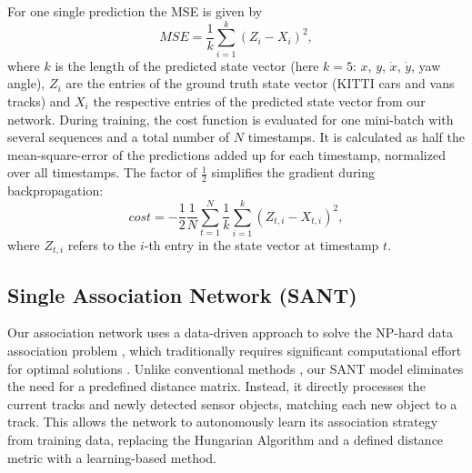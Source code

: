 \documentclass[letterpaper, 10 pt, journal, twoside]{IEEEtran}
\begin{document}
For one single prediction the \ac{MSE} is given by
\begin{equation}
	MSE = \frac{1}{k}\sum_{i=1}^{k}{({Z}_i-{{X}}_i)}^2,
\end{equation}
where $k$ is the length of the predicted state vector (here $k=5$: $x$, $y$, $\dot{x}$, $\dot{y}$, yaw angle), $Z_i$ are the entries of the ground truth state vector (KITTI cars and vans tracks) and ${X}_i$ the respective entries of the predicted state vector from our network.
During training, the cost function is evaluated for one mini-batch with several sequences and a total number of $N$ timestamps.
It is calculated as half the mean-square-error of the predictions added up for each timestamp, normalized over all timestamps.
The factor of $\frac{1}{2}$ simplifies the gradient during backpropagation:
\begin{equation}
	cost = -\frac{1}{2}\frac{1}{N} \sum_{t=1}^{N}\frac{1}{k}\sum_{i=1}^{k}{({Z_{t,i}}-{{X}_{t,i}})}^2,
\end{equation}
where $Z_{t,i}$ refers to the $i$-th entry in the state vector at timestamp $t$.

\subsection{Single Association Network (SANT)}
Our association network uses a data-driven approach to solve the NP-hard data association problem {\cite{DA_hungarian.1955,DA_JPDA.1993}}, which traditionally requires significant computational effort for optimal solutions {\cite{DA_hungarian.1955}}.
Unlike conventional methods {\cite{DL_RNN_mot.2016, DL_RNN_data_association.2019}}, our \ac{SANT} model eliminates the need for a predefined distance matrix. Instead, it directly processes the current tracks and newly detected sensor objects, matching each new object to a track. This allows the network to autonomously learn its association strategy from training data, replacing the Hungarian Algorithm and a defined distance metric with a learning-based method.
\end{document}
